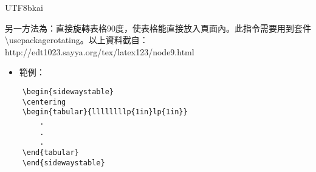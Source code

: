 \documentclass[12pt,a4paper]{report}
\begin{document}
\begin{CJK}{UTF8}{bkai}
	\begin{center}
	\begin{table}[h]
	\caption{Sizing Example}
	\end{table}
	\end{center}


另一方法為：直接旋轉表格90度，使表格能直接放入頁面內。此指令需要用到套件 \textbackslash usepackage\textbraceleft rotating\textbraceright。以上資料截自：http://edt1023.sayya.org/tex/latex123/node9.html

\vspace{0.5cm}
\begin{itemize}
    \item 範例：
\end{itemize}

\vspace{-0.5cm}
\begin{lstlisting}
	\begin{sidewaystable}
	\centering
	\begin{tabular}{llllllllp{1in}lp{1in}}
		.
		.
		.
	\end{tabular}
	\end{sidewaystable}
\end{lstlisting}




\end{CJK}
\end{document}
